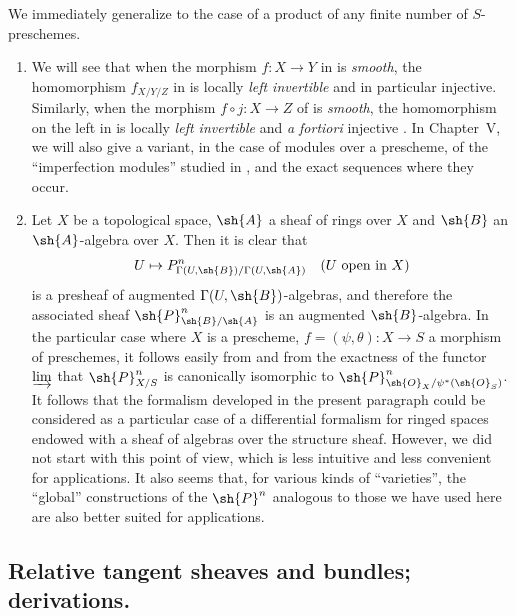 We immediately generalize  to the case of a product of any finite number of $S$-preschemes.

\begin{remarks}[16.4.24]
\label{IV.16.4.24}
\medskip\noindent
\begin{enumerate}
  \item[(i)] We will see  that when the morphism $f: X \to Y$ in  is \emph{smooth}, the homomorphism $f_{X/Y/Z}$ in  is locally \emph{left invertible} and in particular injective.
  Similarly, when the morphism $f \circ j: X \to Z$ of  is \emph{smooth}, the homomorphism on the left in  is locally \emph{left invertible} and \textit{a fortiori} injective .
  In Chapter~V, we will also give a variant, in the case of modules over a prescheme, of the ``imperfection modules'' studied in , and the exact sequences where they occur.
  \item[(ii)] Let $X$ be a topological space, $\sh{A}$ a sheaf of rings over $X$ and $\sh{B}$ an $\sh{A}$-algebra over $X$.
  Then it is clear that 
  \[
    U \mapsto P_{\Gamma(U, \sh{B})/\Gamma(U, \sh{A})}^n \quad \text{($U$ open in $X$)}
  \]
  is a presheaf of augmented $\Gamma(U, \sh{B})$-algebras, and therefore the associated sheaf $\sh{P}_{\sh{B}/\sh{A}}^n$ is an augmented $\sh{B}$-algebra.
  In the particular case where $X$ is a prescheme, $f = (\psi, \theta): X \to S$ a morphism of preschemes, it follows easily from  and from the exactness of the functor $\varinjlim$ that $\sh{P}_{X/S}^n$ is canonically isomorphic to $\sh{P}_{\sh{O}_X/\psi^*(\sh{O}_S)}^n$.
  It follows that the formalism developed in the present paragraph could be considered as a
  particular case of a differential formalism for ringed spaces endowed with a sheaf of algebras over the structure sheaf.
  However, we did not start with this point of view, which is less intuitive and less convenient for applications.
  It also seems that, for various kinds of ``varieties'', the ``global'' constructions of the $\sh{P}^n$ analogous to those we have used here are also better suited for applications.
\end{enumerate}
\end{remarks}

\subsection{Relative tangent sheaves and bundles; derivations.}
\label{IV.16.5}

